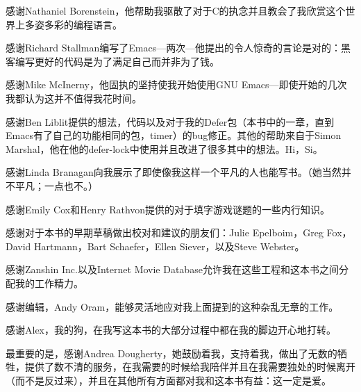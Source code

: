 感谢Nathaniel Borenstein，他帮助我驱散了对于C的执念并且教会了我欣赏这个世界上多姿多彩的编程语言。

感谢Richard Stallman编写了Emacs---两次---他提出的令人惊奇的言论是对的：黑客编写更好的代码是为了满足自己而并非为了钱。

感谢Mike McInerny，他固执的坚持使我开始使用GNU Emacs---即使开始的几次我都认为这并不值得我花时间。

感谢Ben Liblit提供的想法，代码以及对于我的Defer包（本书中的一章，直到Emacs有了自己的功能相同的包，timer）的bug修正。其他的帮助来自于Simon Marshal，他在他的defer-lock中使用并且改进了很多其中的想法。Hi，Si。

感谢Linda Branagan向我展示了即使像我这样一个平凡的人也能写书。（她当然并不平凡；一点也不。）

感谢Emily Cox和Henry Rathvon提供的对于填字游戏谜题的一些内行知识。

感谢对于本书的早期草稿做出校对和建议的朋友们：Julie Epelboim，Greg Fox，David Hartmann，Bart Schaefer，Ellen Siever，以及Steve Webster。

感谢Zanshin Inc.以及Internet Movie Database允许我在这些工程和这本书之间分配我的工作精力。

感谢编辑，Andy Oram，能够灵活地应对我上面提到的这种杂乱无章的工作。

感谢Alex，我的狗，在我写这本书的大部分过程中都在我的脚边开心地打转。

最重要的是，感谢Andrea Dougherty，她鼓励着我，支持着我，做出了无数的牺牲，提供了数不清的服务，在我需要的时候给我陪伴并且在我需要独处的时候离开（而不是反过来），并且在其他所有方面都对我和这本书有益：这一定是爱。
